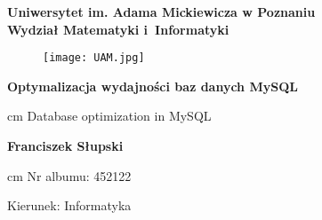 \documentclass[11pt,a4paper,leqno]{article}
\begin{document}
\pagestyle{fancy}  %
\fancyhead{}
\fancyhead[RE,LO]{\ }
\fancyhead[CE,CO]{\ }
\fancyfoot[LE,RO]{\small\textrm{\textsf{\thepage}}}
\fancyfoot[RE,LO]{\ }
\fancyfoot[CE,CO]{\ }

\renewcommand{\headrulewidth}{0.4pt}
\renewcommand{\footrulewidth}{0.4pt}




\begin{titlepage}%
	
	\let\footnotesize\small
	\let\footnoterule\relax
	\let \footnote \thanks
	
	\begin{center}%
		{\Large \bf Uniwersytet im. Adama Mickiewicza w Poznaniu \\ Wydział Matematyki i~Informatyki\par}
	\end{center}%
	\vspace{-0.5 cm}
	\noindent\hrulefill
	
	\vspace{0.75cm plus 1mm minus 2mm}
	
	\setlength{\oddsidemargin}{0.2in}
	\begin{figure}[h]
		\label{UAM}
		\begin{center}
			\leavevmode
			\texttt{[image: UAM.jpg]}
		\end{center}
	\end{figure}
	\setlength{\oddsidemargin}{0.5in}
	
	\vspace{1 cm plus 1mm minus 2mm}
	
	\begin{center}%
		{\Large\textbf{Optymalizacja wydajności baz danych MySQL}\par
			 cm
			{\large Database optimization in MySQL} }
		
		\vspace{1.0cm plus 1fill}
		\begin{flushleft}%
			{\center 
				\Large\textbf{Franciszek Słupski}\par
				 cm
				\small 
				Nr albumu: 452122\par
				Kierunek: Informatyka\par
			}
			

\end{flushleft}
\end{center}
\end{titlepage}
\end{document}
